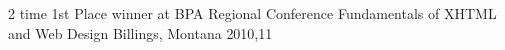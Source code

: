 

\begin{cvhonors}

  \cvhonor %
    {2 time 1st Place winner at BPA Regional Conference} %
    {Fundamentals of XHTML and Web Design} %
    {Billings, Montana} %
    {2010,11} %


\end{cvhonors}
